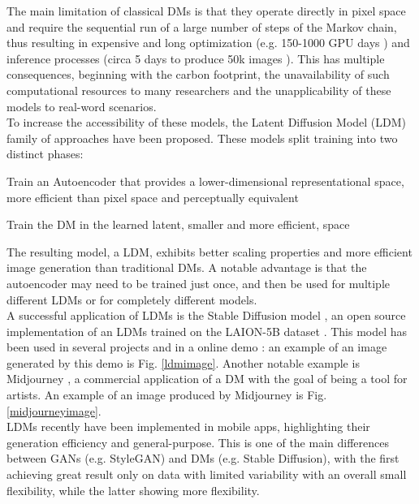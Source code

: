 \documentclass[conference]{IEEEtran}
\begin{document}
The main limitation of classical DMs is that they operate directly in pixel space and require the sequential run of a large number of steps of the Markov chain, thus resulting in expensive and long optimization (e.g. 150-1000 GPU days \cite{gpudays}) and inference processes (circa 5 days to produce 50k images \cite{gpudays}). This has multiple consequences, beginning with the carbon footprint, the unavailability of such computational resources to many researchers and the unapplicability of these models to real-word scenarios.\\
To increase the accessibility of these models, the Latent Diffusion Model (LDM) \cite{latentdiffusionpaper} family of approaches have been proposed. These models split training into two distinct phases:
\begin{list}{-}{}
	\item Train an Autoencoder \cite{autoencoders} that provides a lower-dimensional representational space, more efficient than pixel space and perceptually equivalent
	\item Train the DM in the learned latent, smaller and more efficient, space
\end{list}
The resulting model, a LDM, exhibits better scaling properties and more efficient image generation than traditional DMs. A notable advantage is that the autoencoder may need to be trained just once, and then be used for multiple different LDMs or for completely different models.\\
A successful application of LDMs is the Stable Diffusion model \cite{stablediffusionesource}, an open source implementation of an LDMs trained on the LAION-5B dataset \cite{laion5b}. This model has been used in several projects \cite{stablediffusionprojects} and in a online demo \cite{stablediffusiondemo}: an example of an image generated by this demo is Fig. \ref{ldmimage}. Another notable example is Midjourney \cite{midjourney}, a commercial application of a DM with the goal of being a tool for artists. An example of an image produced by Midjourney is Fig. \ref{midjourneyimage}.\\
LDMs recently have been implemented in mobile apps, highlighting their generation efficiency and general-purpose. This is one of the main differences between GANs (e.g. StyleGAN) and DMs (e.g. Stable Diffusion), with the first achieving great result only on data with limited variability with an overall small flexibility, while the latter showing more flexibility.
\end{document}
